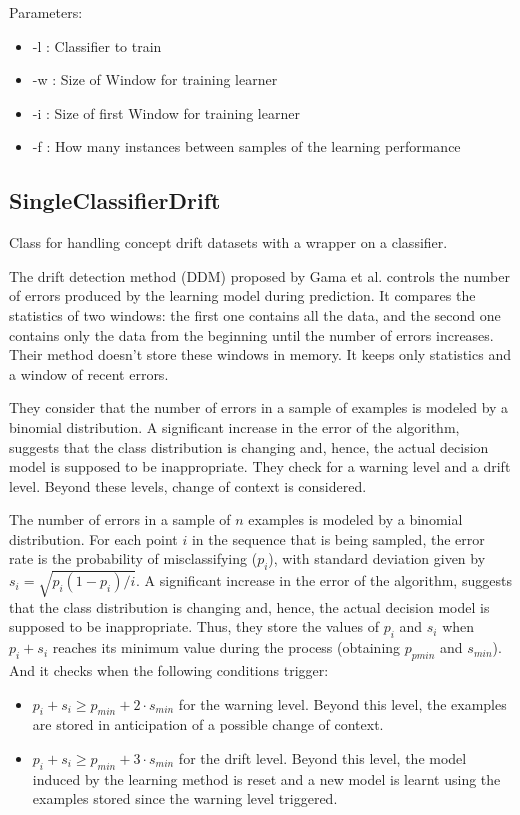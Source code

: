 \documentclass[a4paper,12pt,twoside]{book}
\begin{document}
Parameters:

\begin{itemize}
\item -l : Classifier to train
\item -w : Size of Window for training learner
\item -i : Size of first Window for training learner
\item -f : How many instances between samples of the learning performance
\end{itemize}

 \subsection{SingleClassifierDrift} Class for handling concept drift datasets with a wrapper on a
 classifier.

The drift detection method (DDM) proposed by Gama et al. controls 
the number of errors produced by the learning model during prediction. 
It compares the statistics of two windows: the first one contains all the data, 
and the second one contains only the data from the beginning until the number of
errors increases. Their method doesn't store these windows in memory. It keeps 
only statistics and a window of recent errors.

They consider that the number of errors in a sample of examples is modeled by a binomial 
distribution. A significant increase in the error of the algorithm, suggests
that the class distribution is changing and, hence, the actual decision model is
supposed to be inappropriate. They check for a warning level and a drift level. Beyond
these levels, change of context is considered.

The number of errors in a sample of $n$ examples is modeled by a binomial 
distribution. For each point $i$ in the sequence that is being sampled, the error
rate is the probability of misclassifying ($p_i$), with standard deviation given
by $s_i = \sqrt{p_i(1 - p_i)/i}$. 
A significant increase in the error of the algorithm, suggests
that the class distribution is changing and, hence, the actual decision model is
supposed to be inappropriate. Thus, they store the values of $p_i$ and $s_i$ when
$p_i+s_i$ reaches its minimum value during the process (obtaining $p_{pmin}$ and $s_{min}$).
And it checks when the following conditions trigger:
\begin{itemize}
\item $p_i + s_i \geq p_{min} + 2 \cdot s_{min}$ for the warning level. 
	Beyond this level, the examples are stored in anticipation of a possible
	change of context.
\item $p_i + s_i \geq p_{min} + 3 \cdot s_{min}$ for the drift level. Beyond this
	level, the model induced by the learning method is reset and a new model
	is learnt using the examples stored since the warning level triggered.
\end{itemize}
\end{document}
